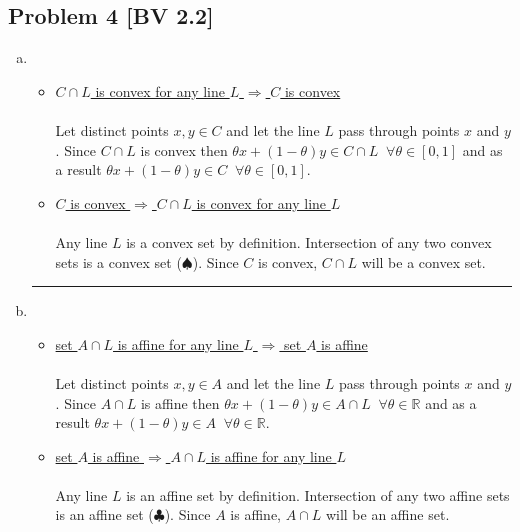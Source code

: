 \documentclass[12pt, letterpaper, twoside]{article}
\newcommand{\R}{\mathbb{R}}
\begin{document}
\subsection*{Problem 4 \small[BV 2.2]} 
\begin{enumerate}[(a)]
    \item
        \begin{itemize}[label={}]
            \item {\color{cyan}\fbox{$\Rightarrow$}}
            \underline{$C\cap L$ is convex for any line $L$ $\Rightarrow$ $C$ is convex}\\\\
            Let distinct points $x,y\in C$ and let the line $L$ pass through points $x$ and $y$. Since $C\cap L$ is convex then $\theta x + (1-\theta)y\in C\cap L\;\;\forall \theta\in[0,1]$ and as a result $\theta x + (1-\theta)y\in C\;\;\forall \theta\in[0,1]$.\\
            
            \item {\color{cyan}\fbox{$\Leftarrow$}} 
            \underline{$C$ is convex $\Rightarrow$ $C\cap L$ is convex for any line $L$ }\\\\
            Any line $L$ is a convex set by definition. Intersection of any two convex sets is a convex set ($\spadesuit$). Since $C$ is convex, $C\cap L$ will be a convex set.
        \end{itemize}
    {\centering \rule{0.4\textwidth}{0.4pt}\par}    
    \item
        \begin{itemize}[label={}]
            \item {\color{cyan}\fbox{$\Rightarrow$}} 
            \underline{set $A\cap L$ is affine for any line $L$ $\Rightarrow$ set $A$ is affine}\\\\
            Let distinct points $x,y\in A$ and let the line $L$ pass through points $x$ and $y$. Since $A\cap L$ is affine then $\theta x + (1-\theta)y\in A\cap L\;\;\forall \theta\in\R$ and as a result $\theta x + (1-\theta)y\in A\;\;\forall \theta\in\R$.\\
            
            \item {\color{cyan}\fbox{$\Leftarrow$}} 
            \underline{set $A$ is affine $\Rightarrow$ $A\cap L$ is affine for any line $L$ }\\\\
            Any line $L$ is an affine set by definition. Intersection of any two affine sets is an affine set ($\clubsuit$). Since $A$ is affine, $A\cap L$ will be an affine set.
            
        \end{itemize}
\end{enumerate}
\end{document}
